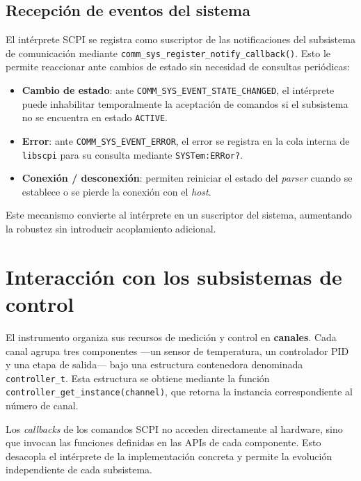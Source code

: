 \subsection{Recepción de eventos del sistema}

El intérprete SCPI se registra como suscriptor de las notificaciones del
subsistema de comunicación mediante
\texttt{comm\_sys\_register\_notify\_callback()}. Esto le permite reaccionar
ante cambios de estado sin necesidad de consultas periódicas:

\begin{itemize}
    \item \textbf{Cambio de estado}: ante
          \texttt{COMM\_SYS\_EVENT\_STATE\_CHANGED}, el intérprete puede
          inhabilitar temporalmente la aceptación de comandos si el subsistema
          no se encuentra en estado \texttt{ACTIVE}.
    \item \textbf{Error}: ante \texttt{COMM\_SYS\_EVENT\_ERROR}, el error se
          registra en la cola interna de \texttt{libscpi} para su consulta
          mediante \texttt{SYSTem:ERRor?}.
    \item \textbf{Conexión / desconexión}: permiten reiniciar el estado del
          \textit{parser} cuando se establece o se pierde la conexión con el
          \textit{host}.
\end{itemize}

Este mecanismo convierte al intérprete en un suscriptor del sistema, aumentando
la robustez sin introducir acoplamiento adicional.

\section{Interacción con los subsistemas de control}

El instrumento organiza sus recursos de medición y control en \textbf{canales}.
Cada canal agrupa tres componentes —un sensor de temperatura, un controlador
PID y una etapa de salida— bajo una estructura contenedora denominada
\texttt{controller\_t}. Esta estructura se obtiene mediante la función
\texttt{controller\_get\_instance(channel)}, que retorna la instancia
correspondiente al número de canal.

Los \textit{callbacks} de los comandos SCPI no acceden directamente al
hardware, sino que invocan las funciones definidas en las APIs de cada
componente. Esto desacopla el intérprete de la implementación concreta y
permite la evolución independiente de cada subsistema.

